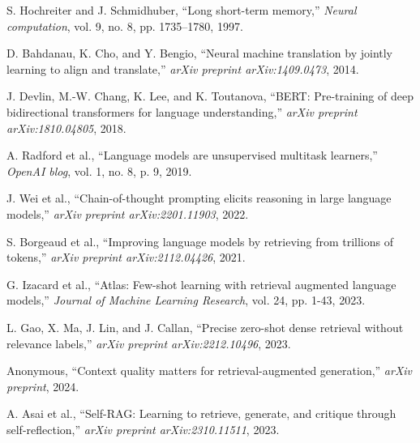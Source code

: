 \documentclass[conference]{IEEEtran}
\begin{document}
\begin{thebibliography}{99}
S. Hochreiter and J. Schmidhuber, ``Long short-term memory,'' \textit{Neural computation}, vol. 9, no. 8, pp. 1735–1780, 1997.

D. Bahdanau, K. Cho, and Y. Bengio, ``Neural machine translation by jointly learning to align and translate,'' \textit{arXiv preprint arXiv:1409.0473}, 2014.

J. Devlin, M.-W. Chang, K. Lee, and K. Toutanova, ``BERT: Pre-training of deep bidirectional transformers for language understanding,'' \textit{arXiv preprint arXiv:1810.04805}, 2018.

A. Radford et al., ``Language models are unsupervised multitask learners,'' \textit{OpenAI blog}, vol. 1, no. 8, p. 9, 2019.

J. Wei et al., ``Chain-of-thought prompting elicits reasoning in large language models,'' \textit{arXiv preprint arXiv:2201.11903}, 2022.

S. Borgeaud et al., ``Improving language models by retrieving from trillions of tokens,'' \textit{arXiv preprint arXiv:2112.04426}, 2021.

G. Izacard et al., ``Atlas: Few-shot learning with retrieval augmented language models,'' \textit{Journal of Machine Learning Research}, vol. 24, pp. 1-43, 2023.

L. Gao, X. Ma, J. Lin, and J. Callan, ``Precise zero-shot dense retrieval without relevance labels,'' \textit{arXiv preprint arXiv:2212.10496}, 2023.

Anonymous, ``Context quality matters for retrieval-augmented generation,'' \textit{arXiv preprint}, 2024.

A. Asai et al., ``Self-RAG: Learning to retrieve, generate, and critique through self-reflection,'' \textit{arXiv preprint arXiv:2310.11511}, 2023.

\end{thebibliography}
\end{document}
